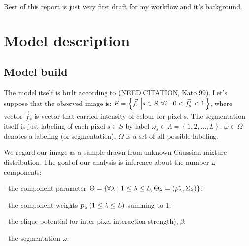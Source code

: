 \documentclass{article}
\begin{document}
Rest of this report is just very first draft for my workflow and it's background.

\section{Model description}
\subsection{Model build}
The model itself is built according to (NEED CITATION, Kato,99).
Let's suppose that the observed image is:
$\textsl{F} = \left\{ \vec{f}_{s} \left| s \in \textsl{S}, \forall i : 0 < \vec{f}^{i}_{s} < 1 \right. \right\}$,
where vector $\vec{f}_{s}$ is vector that carried intensity of colour for pixel s. The segmentation itself is just labeling of each pixel $s \in S$ by label $\omega_{s} \in \Lambda = \left\{ 1,2,...,L \right\}$. $\omega\in\Omega$ denotes a labeling (or segmentation), $\Omega$ is a set of all possible labeling.

We regard our image as a sample drawn from unknown Gaussian mixture distribution. The goal of our analysis is inference about the number 
$\textsl{L}$ 
components:

- the component parameter $\Theta = \left\{\forall\lambda : 1\leq \lambda \leq \textsl{L}, \Theta_{\lambda}=\left(\vec{\mu_{\lambda}},\Sigma_{\lambda} \right) \right\}$;


- the component weights $\textsl p_{\lambda}\left(1\leq\lambda\leq \textsl L \right)$ summing to 1;

- the clique potential (or inter-pixel interaction strength), $\beta$;
 
- the segmentation $\omega$.
\end{document}

